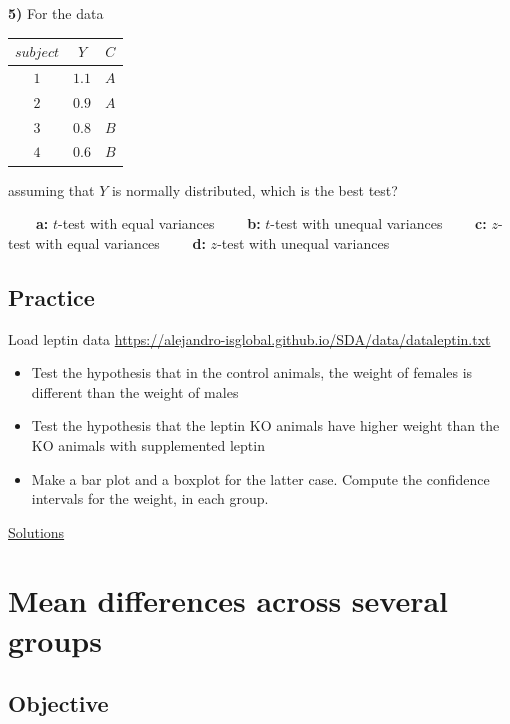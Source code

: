 \documentclass[
]{book}
\begin{document}
\textbf{5)} For the data

\begin{longtable}[]{@{}ccc@{}}
\toprule\noalign{}
\(subject\) & \(Y\) & \(C\) \\
\midrule\noalign{}
\endhead
\bottomrule\noalign{}
\endlastfoot
\(1\) & \(1.1\) & \(A\) \\
\(2\) & \(0.9\) & \(A\) \\
\(3\) & \(0.8\) & \(B\) \\
\(4\) & \(0.6\) & \(B\) \\
\end{longtable}

assuming that \(Y\) is normally distributed, which is the best test?

\textbf{\(\qquad\)a:} \(t\)-test with equal variances
\textbf{\(\qquad\)b:} \(t\)-test with unequal variances
\textbf{\(\qquad\)c:} \(z\)-test with equal variances
\textbf{\(\qquad\)d:} \(z\)-test with unequal variances

\hypertarget{practice-6}{%
\section{Practice}\label{practice-6}}

Load leptin data \url{https://alejandro-isglobal.github.io/SDA/data/dataleptin.txt}

\begin{itemize}
\item
  Test the hypothesis that in the control animals, the weight of females is different than the weight of males
\item
  Test the hypothesis that the leptin KO animals have higher weight than the KO animals with supplemented leptin
\item
  Make a bar plot and a boxplot for the latter case. Compute the confidence intervals for the weight, in each group.
\end{itemize}

\href{https://colab.research.google.com/drive/1F61puLHyUBuS5ERbbruy4002bQ3C3DjY?usp=sharing}{Solutions}

\hypertarget{mean-differences-across-several-groups}{%
\chapter{Mean differences across several groups}\label{mean-differences-across-several-groups}}

\hypertarget{objective-12}{%
\section{Objective}\label{objective-12}}
\end{document}
